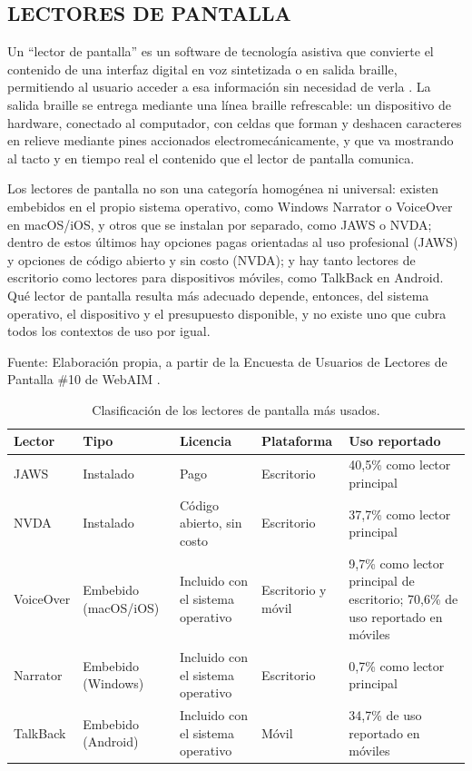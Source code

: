 
\subsection{LECTORES DE PANTALLA}

Un ``lector de pantalla'' es un software de tecnología asistiva que convierte el contenido de una interfaz digital en voz sintetizada o en salida braille, permitiendo al usuario acceder a esa información sin necesidad de verla \cite{w3ctoolstechniques}. La salida braille se entrega mediante una línea braille refrescable: un dispositivo de hardware, conectado al computador, con celdas que forman y deshacen caracteres en relieve mediante pines accionados electromecánicamente, y que va mostrando al tacto y en tiempo real el contenido que el lector de pantalla comunica.

Los lectores de pantalla no son una categoría homogénea ni universal: existen embebidos en el propio sistema operativo, como Windows Narrator o VoiceOver en macOS/iOS, y otros que se instalan por separado, como JAWS o NVDA; dentro de estos últimos hay opciones pagas orientadas al uso profesional (JAWS) y opciones de código abierto y sin costo (NVDA); y hay tanto lectores de escritorio como lectores para dispositivos móviles, como TalkBack en Android. Qué lector de pantalla resulta más adecuado depende, entonces, del sistema operativo, el dispositivo y el presupuesto disponible, y no existe uno que cubra todos los contextos de uso por igual.

\begin{table}[h]
    \centering
    \caption{\label{table:lectorespantalla} Clasificación de los lectores de pantalla más usados.} Fuente: Elaboración propia, a partir de la Encuesta de Usuarios de Lectores de Pantalla \#10 de WebAIM \cite{webaim2024screenreadersurvey10}.
    \begin{tabular}{|p{2cm}|p{2.1cm}|p{2.4cm}|p{2cm}|p{4.1cm}|}
        \hline
        \textbf{Lector} & \textbf{Tipo} & \textbf{Licencia} & \textbf{Plataforma} & \textbf{Uso reportado} \\
        \hline
        JAWS & Instalado & Pago & Escritorio & 40,5\% como lector principal \\
        \hline
        NVDA & Instalado & Código abierto, sin costo & Escritorio & 37,7\% como lector principal \\
        \hline
        VoiceOver & Embebido (macOS/iOS) & Incluido con el sistema operativo & Escritorio y móvil & 9,7\% como lector principal de escritorio; 70,6\% de uso reportado en móviles \\
        \hline
        Narrator & Embebido (Windows) & Incluido con el sistema operativo & Escritorio & 0,7\% como lector principal \\
        \hline
        TalkBack & Embebido (Android) & Incluido con el sistema operativo & Móvil & 34,7\% de uso reportado en móviles \\
        \hline
    \end{tabular}
\end{table}

